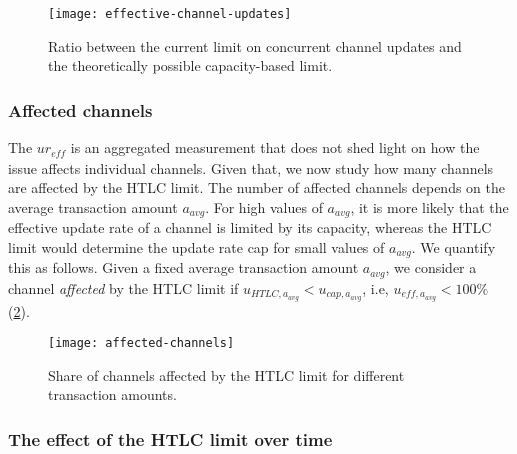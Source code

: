 \begin{figure}
	\centering
	\texttt{[image: effective-channel-updates]}
	\caption{Ratio between the current limit on concurrent channel updates and the theoretically possible 
		capacity-based limit.\label{fig:effective-channel-updates}}
\end{figure}

\subsubsection*{Affected channels}
The $ur_\textit{eff}$ is an aggregated measurement that does not shed 
light on how the issue affects individual channels.  
Given that, we now study how many channels are affected by the HTLC limit.
The number of affected channels depends on the average transaction amount $a_\textit{avg}$. 
For high values of $a_\textit{avg}$, it is more likely that 
the effective update rate of a channel is limited by its capacity, 
whereas the HTLC limit would determine the update rate cap for small values of $a_\textit{avg}$.
We quantify this as follows.
Given a fixed average transaction amount $a_\textit{avg}$, 
we consider a channel \textit{affected} by the HTLC limit if $u_{\textit{HTLC},a_\textit{avg}} < u_{\textit{cap},a_\textit{avg}}$, i.e, $u_{\textit{eff},a_\textit{avg}} < 100\%$ (\cref{fig:affected-channels}).

\begin{figure}
	\centering
	\texttt{[image: affected-channels]}
	\caption{Share of channels affected by the HTLC limit for different transaction amounts. \label{fig:affected-channels}}
\end{figure}



\subsubsection*{The effect of the HTLC limit over time}



